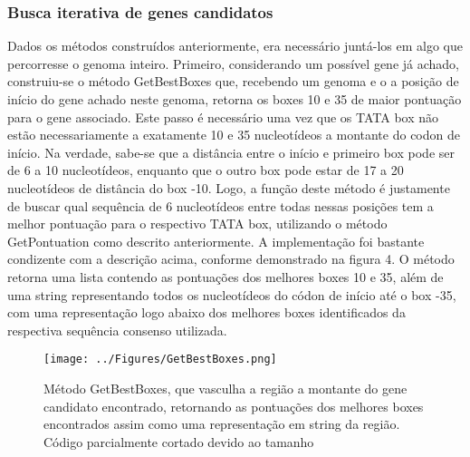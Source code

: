 \documentclass[brazilian,12pt,a4paper,final]{article}
\begin{document}
	\subsubsection{Busca iterativa de genes candidatos}
	Dados os métodos construídos anteriormente, era necessário juntá-los em algo que percorresse o genoma inteiro. Primeiro, considerando um possível gene já achado, construiu-se o método GetBestBoxes que, recebendo um genoma e o a posição de início do gene achado neste genoma, retorna os boxes 10 e 35 de maior pontuação para o gene associado. Este passo é necessário uma vez que os TATA box não estão necessariamente a exatamente 10 e 35 nucleotídeos a montante do codon de início. Na verdade, sabe-se que a distância entre o início e primeiro box pode ser de 6 a 10 nucleotídeos, enquanto que o outro box pode estar de 17 a 20 nucleotídeos de distância do box -10. Logo, a função deste método é justamente de buscar qual sequência de 6 nucleotídeos entre todas nessas posições tem a melhor pontuação para o respectivo TATA box, utilizando o método GetPontuation como descrito anteriormente. A implementação foi bastante condizente com a descrição acima, conforme demonstrado na figura 4. O método retorna uma lista contendo as pontuações dos melhores boxes 10 e 35, além de uma string representando todos os nucleotídeos do códon de início até o box -35, com uma representação logo abaixo dos melhores boxes identificados da respectiva sequência consenso utilizada.
	
	\begin{figure}[hbtp]
		\begin{center}
			\texttt{[image: ../Figures/GetBestBoxes.png]}
			\caption{Método GetBestBoxes, que vasculha a região a montante do gene candidato encontrado, retornando as pontuações dos melhores boxes encontrados assim como uma representação em string da região. Código parcialmente cortado devido ao tamanho}
			\label{fig}
		\end{center}
	\end{figure}
	
\end{document}
